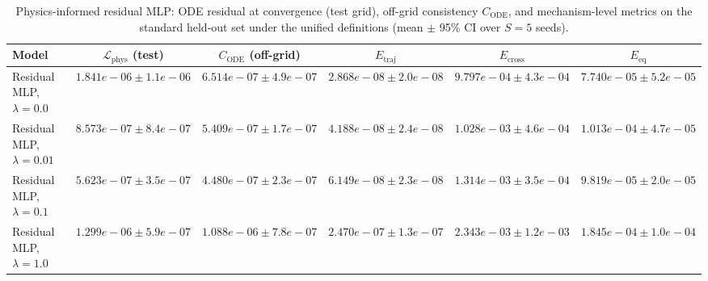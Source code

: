 \begin{table}[t]
\centering
\scriptsize
\caption{Physics-informed residual MLP: ODE residual at convergence (test grid), off-grid consistency $C_{\mathrm{ODE}}$, and mechanism-level metrics on the standard held-out set under the unified definitions (mean $\pm$ 95\% CI over $S=5$ seeds).}
\label{tab:pi_gradient}
\begin{tabular}{lccccc}
\hline
Model & $\mathcal L_{\mathrm{phys}}$ (test) & $C_{\mathrm{ODE}}$ (off-grid) & $E_{\mathrm{traj}}$ & $E_{\mathrm{cross}}$ & $E_{\mathrm{eq}}$ \\
\hline
Residual MLP, $\lambda=0.0$ & $1.841e-06 \pm 1.1e-06$ & $6.514e-07 \pm 4.9e-07$ & $2.868e-08 \pm 2.0e-08$ & $9.797e-04 \pm 4.3e-04$ & $7.740e-05 \pm 5.2e-05$ \\
Residual MLP, $\lambda=0.01$ & $8.573e-07 \pm 8.4e-07$ & $5.409e-07 \pm 1.7e-07$ & $4.188e-08 \pm 2.4e-08$ & $1.028e-03 \pm 4.6e-04$ & $1.013e-04 \pm 4.7e-05$ \\
Residual MLP, $\lambda=0.1$ & $5.623e-07 \pm 3.5e-07$ & $4.480e-07 \pm 2.3e-07$ & $6.149e-08 \pm 2.3e-08$ & $1.314e-03 \pm 3.5e-04$ & $9.819e-05 \pm 2.0e-05$ \\
Residual MLP, $\lambda=1.0$ & $1.299e-06 \pm 5.9e-07$ & $1.088e-06 \pm 7.8e-07$ & $2.470e-07 \pm 1.3e-07$ & $2.343e-03 \pm 1.2e-03$ & $1.845e-04 \pm 1.0e-04$ \\
\hline
\end{tabular}
\end{table}